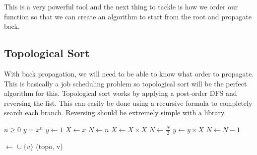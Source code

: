 This is a very powerful tool and the next thing to tackle is how we order our function 
so that we can create an algorithm to start from the root and propagate back.

\newpage 

\subsection{Topological Sort}

With back propagation, we will need to be able to know what order to propagate. 
This is basically a job scheduling problem so topological sort will be the perfect algorithm for this.
Topological sort works by applying a post-order DFS and reversing the list. This can easily be done 
using a recursive formula to completely search each branch. Reversing should be extremely simple with a library.

\begin{algorithm}
\caption{Topological Sort}\label{alg:cap}
    \begin{algorithmic}
        \Require $n \geq 0$
        \Ensure $y = x^n$
        \State $y \gets 1$
        \State $X \gets x$
        \State $N \gets n$
                \State $X \gets X \times X$
                \State $N \gets \frac{N}{2}$  
                \State $y \gets y \times X$
                \State $N \gets N - 1$
            \EndIf
        \EndWhile
    \end{algorithmic}
\end{algorithm}

\begin{algorithm}[H]
\caption{DFS for Topological Sort}
\begin{algorithmic}
        \State  {} $\gets$  $\cup \ \{v\}$
            \State {}
        \EndFor
        \State {}(topo, v)
    \EndIf
\EndProcedure
\end{algorithmic}
\end{algorithm}

